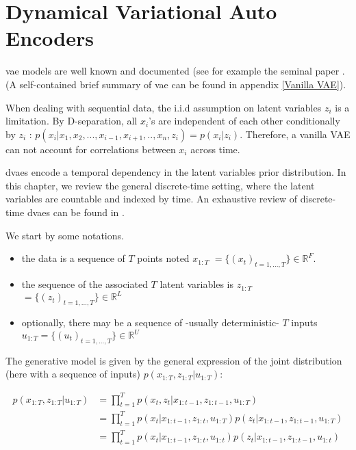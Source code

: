 \chapter{Dynamical Variational Auto Encoders}\label{sec:DVAEs}

\gls{vae} models are well known and documented (see for example the seminal paper \cite{kingma_introduction_2019}. (A self-contained brief summary of \gls{vae} can be found in appendix \ref{Vanilla VAE}). 

When dealing with sequential data, the i.i.d assumption on latent variables $z_i$ is a limitation. By D-separation, all $x_i$'s are independent of each other conditionally by $z_i$ : $p(x_i \vert x_1, x_2,...,x_{i-1},x_{i+1},..,x_n,z_i) = p(x_i \vert z_i)$. Therefore, a vanilla VAE can not account for correlations between $x_i$ across time.

\glspl{dvae} encode a temporal dependency in the latent variables prior distribution. In this chapter, we review the general discrete-time setting, where the latent variables are countable and indexed by time. An exhaustive review of discrete-time \glspl{dvae} can be found in \cite{girin_dynamical_2022}.

We start by some notations.

\begin{tcolorbox}[colback=blue!5!white,colframe=black!75!black,title=Notations]
\begin{itemize}
    \item the data is a sequence of $T$ points noted \textbf{$x_{1:T}$} $= \{(x_t)_{t=1,...,T}\} \in \mathbb{R}^F$.
    \item the sequence of the associated $T$ latent variables is \textbf{$z_{1:T}$} $= \{(z_t)_{t=1,...,T}\} \in \mathbb{R}^L$
    \item optionally, there may be a sequence of -usually deterministic- $T$ inputs $u_{1:T} = \{(u_t)_{t=1,...,T}\} \in \mathbb{R}^U$
\end{itemize}
\end{tcolorbox}

The generative model is given by the general expression of the joint distribution (here with a sequence of inputs) $p(x_{1:T}, z_{1:T} \vert u_{1:T})$:

\begin{align*}
    p(x_{1:T}, z_{1:T} \vert u_{1:T}) &= \prod_{t=1}^T p(x_t, z_t \vert x_{1:t-1}, z_{1:t-1}, u_{1:T}) \\
    &= \prod_{t=1}^T p(x_t \vert x_{1:t-1}, z_{1:t}, u_{1:T}) p(z_t \vert x_{1:t-1}, z_{1:t-1}, u_{1:T}) \\
    &= \prod_{t=1}^T p(x_t \vert x_{1:t-1}, z_{1:t}, u_{1:t}) p(z_t \vert x_{1:t-1}, z_{1:t-1}, u_{1:t})
\end{align*}

